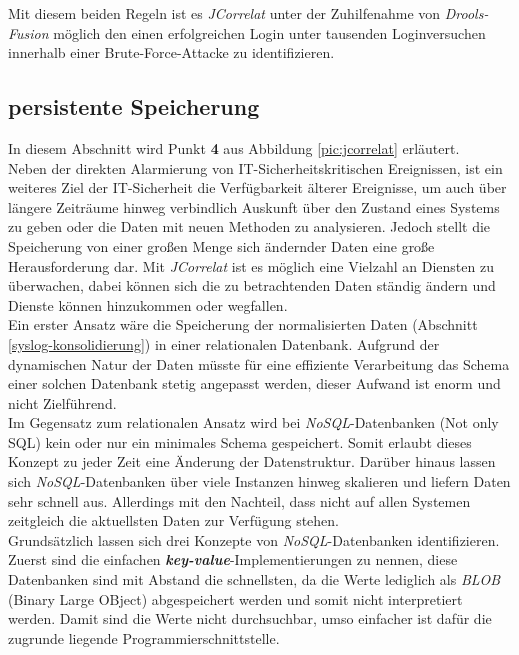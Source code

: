 Mit diesem beiden Regeln ist es \textit{JCorrelat} unter der Zuhilfenahme von 
\textit{Drools-Fusion} möglich den einen erfolgreichen Login unter tausenden 
Loginversuchen innerhalb einer Brute-Force-Attacke zu identifizieren.

\subsection{persistente Speicherung}\label{nosql}

In diesem Abschnitt wird Punkt \textbf{4} aus Abbildung \ref{pic:jcorrelat} erläutert.\\

Neben der direkten Alarmierung von IT-Sicherheitskritischen Ereignissen, ist ein weiteres 
Ziel der IT-Sicherheit die Verfügbarkeit älterer Ereignisse, um auch über längere 
Zeiträume hinweg verbindlich Auskunft über den Zustand eines Systems zu geben oder die 
Daten mit neuen Methoden zu analysieren. Jedoch stellt die Speicherung von einer großen 
Menge sich ändernder Daten eine große Herausforderung dar. Mit \textit{JCorrelat} ist es 
möglich eine Vielzahl an Diensten zu überwachen, dabei können sich die zu betrachtenden 
Daten ständig ändern und Dienste können hinzukommen oder wegfallen.\\

Ein erster Ansatz wäre die Speicherung der normalisierten Daten (Abschnitt 
\ref{syslog-konsolidierung}) in einer relationalen Datenbank. Aufgrund der dynamischen 
Natur der Daten müsste für eine effiziente Verarbeitung das Schema einer solchen 
Datenbank stetig angepasst werden, dieser Aufwand ist enorm und nicht Zielführend.\\
Im Gegensatz zum relationalen Ansatz wird bei \textit{NoSQL}-Datenbanken (Not only SQL) 
kein oder nur ein minimales Schema gespeichert. Somit erlaubt dieses Konzept zu jeder 
Zeit eine Änderung der Datenstruktur. Darüber hinaus lassen sich 
\textit{NoSQL}-Datenbanken über viele Instanzen hinweg skalieren und liefern Daten sehr 
schnell aus. Allerdings mit den Nachteil, dass nicht auf allen Systemen zeitgleich die 
aktuellsten Daten zur Verfügung stehen.\\

Grundsätzlich lassen sich drei Konzepte von \textit{NoSQL}-Datenbanken identifizieren. 
Zuerst sind die einfachen \textbf{\emph{key-value}}-Implementierungen zu nennen, diese 
Datenbanken sind mit Abstand die schnellsten, da die Werte lediglich als \textit{BLOB} 
(Binary Large OBject) abgespeichert werden und somit nicht interpretiert werden. Damit 
sind die Werte nicht durchsuchbar, umso einfacher ist dafür die zugrunde liegende 
Programmierschnittstelle.\\

